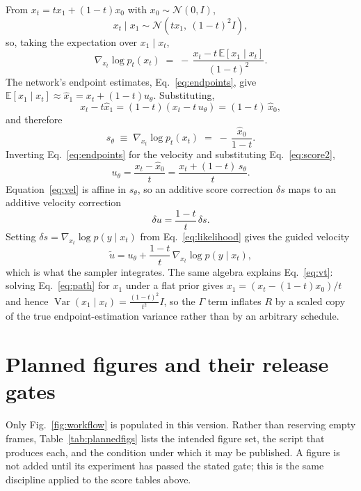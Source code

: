 \documentclass[10pt,twocolumn]{article}
\begin{document}
From $x_t=t x_1+(1-t)x_0$ with $x_0\sim\mathcal{N}(0,I)$,
\begin{equation}
 x_t \mid x_1 \sim \mathcal{N}\!\left(t x_1,\ (1-t)^2 I\right),
\end{equation}
so, taking the expectation over $x_1\mid x_t$,
\begin{equation}
 \nabla_{x_t}\log p_t(x_t)
 \;=\;-\,\frac{x_t-t\,\mathbb{E}[x_1\mid x_t]}{(1-t)^2}.
 \label{eq:score1}
\end{equation}
The network's endpoint estimates, Eq.~\eqref{eq:endpoints}, give
$\mathbb{E}[x_1\mid x_t]\approx\widehat{x}_1=x_t+(1-t)u_\theta$. Substituting,
\begin{equation}
 x_t-t\widehat{x}_1=(1-t)\left(x_t-t\,u_\theta\right)=(1-t)\,\widehat{x}_0,
\end{equation}
and therefore
\begin{equation}
 s_\theta \;\equiv\; \nabla_{x_t}\log p_t(x_t)
 \;=\;-\,\frac{\widehat{x}_0}{1-t}.
 \label{eq:score2}
\end{equation}
Inverting Eq.~\eqref{eq:endpoints} for the velocity and substituting
Eq.~\eqref{eq:score2},
\begin{equation}
 u_\theta=\frac{x_t-\widehat{x}_0}{t}
        =\frac{x_t+(1-t)\,s_\theta}{t}.
 \label{eq:vel}
\end{equation}
Equation~\eqref{eq:vel} is affine in $s_\theta$, so an additive score
correction $\delta s$ maps to an additive velocity correction
\begin{equation}
 \delta u=\frac{1-t}{t}\,\delta s .
 \label{eq:conv}
\end{equation}
Setting $\delta s=\nabla_{x_t}\log p(y\mid x_t)$ from
Eq.~\eqref{eq:likelihood} gives the guided velocity
\begin{equation}
 \tilde{u}=u_\theta+\frac{1-t}{t}\,\nabla_{x_t}\log p(y\mid x_t),
\end{equation}
which is what the sampler integrates. The same algebra explains
Eq.~\eqref{eq:vt}: solving Eq.~\eqref{eq:path} for $x_1$ under a flat prior
gives $x_1=(x_t-(1-t)x_0)/t$ and hence
$\operatorname{Var}(x_1\mid x_t)=\frac{(1-t)^2}{t^2}I$, so the $\Gamma$ term
inflates $R$ by a scaled copy of the true endpoint-estimation variance rather
than by an arbitrary schedule.

\section{Planned figures and their release gates}

Only Fig.~\ref{fig:workflow} is populated in this version. Rather than
reserving empty frames, Table~\ref{tab:plannedfigs} lists the intended figure
set, the script that produces each, and the condition under which it may be
published. A figure is not added until its experiment has passed the stated
gate; this is the same discipline applied to the score tables above.
\end{document}
